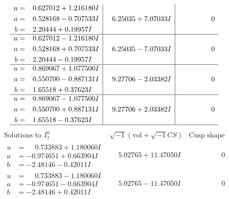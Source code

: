 \documentclass[1p]{elsarticle_modified}
\theoremstyle{definition}
\newcommand{\I}{\sqrt{-1}}
\begin{document}
$$\begin{array}{c|c|c}
\begin{aligned}
u &= \phantom{-}0.627012 + 1.216180 I \\
a &= \phantom{-}0.528168 - 0.707533 I \\
b &= \phantom{-}2.20444 + 0.19957 I\end{aligned}
 & \phantom{-}6.25035 + 7.07033 I & \phantom{-0.000000 } 0 \\ \hline\begin{aligned}
u &= \phantom{-}0.627012 - 1.216180 I \\
a &= \phantom{-}0.528168 + 0.707533 I \\
b &= \phantom{-}2.20444 - 0.19957 I\end{aligned}
 & \phantom{-}6.25035 - 7.07033 I & \phantom{-0.000000 } 0 \\ \hline\begin{aligned}
u &= \phantom{-}0.869067 + 1.077500 I \\
a &= \phantom{-}0.550700 - 0.887131 I \\
b &= \phantom{-}1.65518 + 0.37623 I\end{aligned}
 & \phantom{-}9.27706 - 2.03382 I & \phantom{-0.000000 } 0 \\ \hline\begin{aligned}
u &= \phantom{-}0.869067 - 1.077500 I \\
a &= \phantom{-}0.550700 + 0.887131 I \\
b &= \phantom{-}1.65518 - 0.37623 I\end{aligned}
 & \phantom{-}9.27706 + 2.03382 I & \phantom{-0.000000 } 0\\
 \hline 
 \end{array}$$\newpage$$\begin{array}{c|c|c}  
\text{Solutions to }I^u_{1}& \I (\text{vol} + \sqrt{-1}CS) & \text{Cusp shape}\\
 \hline 
\begin{aligned}
u &= \phantom{-}0.733883 + 1.180060 I \\
a &= -0.974651 + 0.663904 I \\
b &= -2.48146 - 0.42011 I\end{aligned}
 & \phantom{-}5.02765 + 11.47050 I & \phantom{-0.000000 } 0 \\ \hline\begin{aligned}
u &= \phantom{-}0.733883 - 1.180060 I \\
a &= -0.974651 - 0.663904 I \\
b &= -2.48146 + 0.42011 I\end{aligned}
 & \phantom{-}5.02765 - 11.47050 I & \phantom{-0.000000 } 0 \\ \hline\begin{aligned}

\end{aligned}
\end{array}$$
\end{document}
